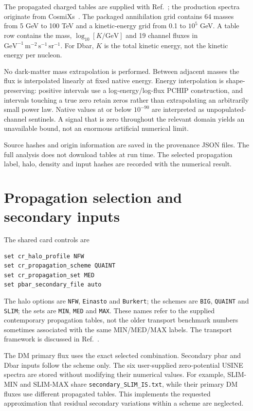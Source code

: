 \documentclass[11pt,a4paper]{article}
\newcommand{\GeV}{\mathrm{GeV}}
\begin{document}
The propagated charged tables are supplied with Ref.~\cite{Cirelli:2026CosmiXsPPPC}; the production spectra originate from CosmiXs~\cite{CosmiXsProduction}. The packaged annihilation grid contains 64 masses from 5 GeV to 100 TeV and a kinetic-energy grid from 0.1 to $10^5$ GeV. A table row contains the mass, $\log_{10}[K/\GeV]$ and 19 channel fluxes in $\GeV^{-1}\,\mathrm{m}^{-2}\,\mathrm{s}^{-1}\,\mathrm{sr}^{-1}$. For Dbar, $K$ is the total kinetic energy, not the kinetic energy per nucleon.

No dark-matter mass extrapolation is performed. Between adjacent masses the flux is interpolated linearly at fixed native energy. Energy interpolation is shape-preserving: positive intervals use a log-energy/log-flux PCHIP construction, and intervals touching a true zero retain zeros rather than extrapolating an arbitrarily small power law. Native values at or below $10^{-90}$ are interpreted as unpopulated-channel sentinels. A signal that is zero throughout the relevant domain yields an unavailable bound, not an enormous artificial numerical limit.

Source hashes and origin information are saved in the provenance JSON files. The full analysis does not download tables at run time. The selected propagation label, halo, density and input hashes are recorded with the numerical result.

\section{Propagation selection and secondary inputs}
The shared card controls are
\begin{lstlisting}
set cr_halo_profile NFW
set cr_propagation_scheme QUAINT
set cr_propagation_set MED
set pbar_secondary_file auto
\end{lstlisting}
The halo options are \texttt{NFW}, \texttt{Einasto} and \texttt{Burkert}; the schemes are \texttt{BIG}, \texttt{QUAINT} and \texttt{SLIM}; the sets are \texttt{MIN}, \texttt{MED} and \texttt{MAX}. These names refer to the supplied contemporary propagation tables, not the older transport benchmark numbers sometimes associated with the same MIN/MED/MAX labels. The transport framework is discussed in Ref.~\cite{Genolini2021}.

The DM primary flux uses the exact selected combination. Secondary pbar and Dbar inputs follow the scheme only. The six user-supplied zero-potential USINE spectra are stored without modifying their numerical values. For example, SLIM-MIN and SLIM-MAX share \texttt{secondary\_SLIM\_IS.txt}, while their primary DM fluxes use different propagated tables. This implements the requested approximation that residual secondary variations within a scheme are neglected.
\end{document}
